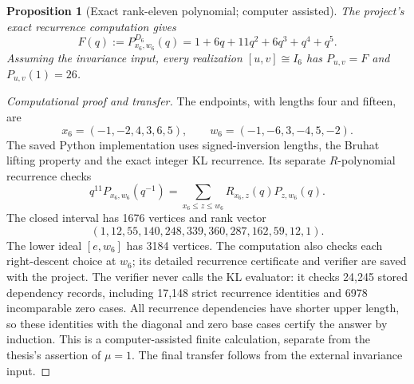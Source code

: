 \documentclass[11pt]{article}
\newtheorem{proposition}[theorem]{Proposition}
\theoremstyle{definition}\newtheorem{definition}[theorem]{Definition}
\theoremstyle{remark}\newtheorem{remark}[theorem]{Remark}
\begin{document}
\begin{proposition}[Exact rank-eleven polynomial; computer assisted]\label{prop:d6}
The project's exact recurrence computation gives
\[
 F(q):=P^{D_6}_{x_6,w_6}(q)=1+6q+11q^2+6q^3+q^4+q^5.
\]
Assuming the invariance input, every realization $[u,v]\cong I_6$
has $P_{u,v}=F$ and $P_{u,v}(1)=26$.
\end{proposition}
\begin{proof}[Computational proof and transfer]
The endpoints, with lengths four and fifteen, are
\[
 x_6=(-1,-2,4,3,6,5),\qquad w_6=(-1,-6,3,-4,5,-2).
\]
The saved Python implementation uses signed-inversion lengths,
the Bruhat lifting property and the exact integer KL recurrence.
Its separate $R$-polynomial recurrence checks
\[
 q^{11}P_{x_6,w_6}(q^{-1})=
 \sum_{x_6\leq z\leq w_6}R_{x_6,z}(q)P_{z,w_6}(q).
\]
The closed interval has 1676 vertices and rank vector
\[
 (1,12,55,140,248,339,360,287,162,59,12,1).
\]
The lower ideal $[e,w_6]$ has 3184 vertices.
The computation also checks each right-descent choice at $w_6$;
its detailed recurrence certificate and verifier are saved with the
project. The verifier never calls the KL evaluator: it checks 24,245
stored dependency records, including 17,148 strict recurrence
identities and 6978 incomparable zero cases. All recurrence
dependencies have shorter upper length, so these identities with
the diagonal and zero base cases certify the answer by induction.
This is a computer-assisted finite calculation, separate
from the thesis's assertion of $\mu=1$.
The final transfer follows from the external invariance input.
\end{proof}
\end{document}
